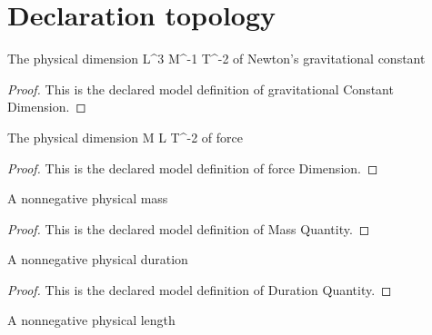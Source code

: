 \section{Declaration topology}
\begin{definition}
  \label{def:physics:phyx-mini-0716:phyxminiproblems-problemphyxmini0716-gravitationalconstantdimension}
  The physical dimension L\textasciicircum{}3 M\textasciicircum{}-1 T\textasciicircum{}-2 of Newton's gravitational constant
\end{definition}
\begin{proof}
  This is the declared model definition of gravitational Constant Dimension.
\end{proof}
\begin{definition}
  \label{def:physics:phyx-mini-0716:phyxminiproblems-problemphyxmini0716-forcedimension}
  The physical dimension M L T\textasciicircum{}-2 of force
\end{definition}
\begin{proof}
  This is the declared model definition of force Dimension.
\end{proof}
\begin{definition}
  \label{def:physics:phyx-mini-0716:phyxminiproblems-problemphyxmini0716-massquantity}
  A nonnegative physical mass
\end{definition}
\begin{proof}
  This is the declared model definition of Mass Quantity.
\end{proof}
\begin{definition}
  \label{def:physics:phyx-mini-0716:phyxminiproblems-problemphyxmini0716-durationquantity}
  A nonnegative physical duration
\end{definition}
\begin{proof}
  This is the declared model definition of Duration Quantity.
\end{proof}
\begin{definition}
  \label{def:physics:phyx-mini-0716:phyxminiproblems-problemphyxmini0716-lengthquantity}
  A nonnegative physical length
\end{definition}
